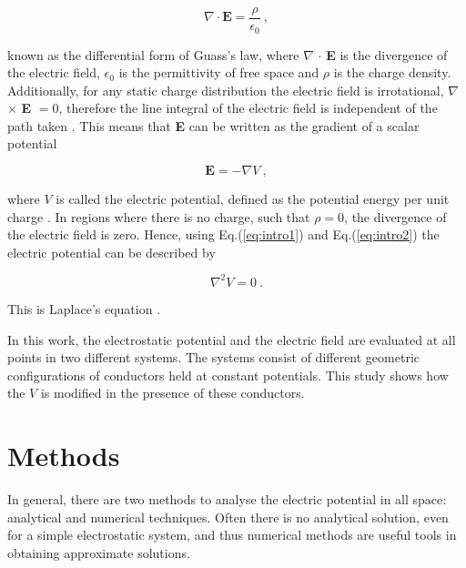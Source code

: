 \documentclass[a4paper]{jpconf}
\begin{document}
\begin{equation}
\textbf{$\nabla$} \cdot \textbf{E} = \frac{\rho}{\epsilon_0}~,
\label{eq:intro1}
\end{equation} 

\noindent known as the differential form of Guass's law, where \textbf{$\nabla$} $\cdot$ \textbf{E} is the divergence of the electric field, $\epsilon_0$ is the permittivity of free space and $\rho$ is the charge density. Additionally, for any static charge distribution the electric field is irrotational, \textbf{$\nabla$} $\times$ \textbf{E} $= 0$, therefore the line integral of the electric field
is independent of the path taken \cite{griffiths-introElec}. This means that \textbf{E} can be written as the gradient of a scalar potential 

\begin{equation}
\textbf{E} = - \nabla V~,
\label{eq:intro2}
\end{equation} 

\noindent where $V$ is called the electric potential, defined as the potential energy per unit charge  \cite{Sears.Zamansky-uniPhy}.
In regions where there is no charge, such that $\rho = 0$, the divergence of the electric field is zero. Hence, using Eq.(\ref{eq:intro1}) and Eq.(\ref{eq:intro2}) the electric potential
can be described by

\begin{equation}
\nabla^2 V = 0~.
\label{eq:intro3}
\end{equation} 

\noindent This is Laplace's equation \cite{RHB-MathematicalMethods}.\\ \par
In this work, the electrostatic potential and the electric field are evaluated at all points in two different systems. The systems consist of different geometric configurations of conductors held at constant potentials. This study shows how the $V$ is modified in the presence of these conductors. 

\section*{Methods}
In general, there are two methods to analyse the electric potential in all space: analytical and numerical techniques. Often there is no analytical solution, even for a simple electrostatic system, and thus numerical methods are useful tools in obtaining approximate solutions. 
\end{document}
